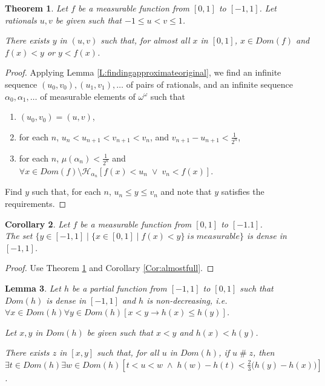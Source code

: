 \documentclass[a4paper]{amsart}
\theoremstyle{plain}
\newtheorem{theorem}{Theorem}
\newtheorem{corollary}[theorem]{Corollary}
\newtheorem{lemma}[theorem]{Lemma}
\begin{document}
 \begin{theorem}\label{T:findingoriginal} Let $f$ be a measurable function from $[0,1]$ to $[-1,1]$. Let rationals $u,v$ be given such that $-1\le u<v\le 1$.
 
 There exists $y$ in $(u,v)$ such that, for almost all $x$ in $[0,1]$, $x\in Dom(f)$ and $f(x) <y$ or $y<f(x)$. 
 \end{theorem} 
 
 \begin{proof} Applying Lemma \ref{L:findingapproximateoriginal}, we find an infinite sequence $(u_0, v_0), (u_1, v_1), \ldots$ of pairs of rationals, and an infinite sequence $\alpha_0, \alpha_1, \ldots$ of measurable elements of $\omega^\omega$ such that \begin{enumerate} \item $(u_0, v_0)= (u, v)$, \item for each $n$, $u_n < u_{n+1} < v_{n+1} < v_n$,  and $v_{n+1} - u_{n+1}<\frac{1}{2^n}$, \item for each $n$, $\mu(\alpha_n) < \frac{1}{2^n}$ and $\forall x \in Dom(f)\setminus \mathcal{H}_{\alpha_n}[f(x) < u_n \;\vee \;v_n < f(x)]$. \end{enumerate}
 
 Find $y$ such that, for each $n$, $u_n \le y \le v_n$ and note that $y$ satisfies the requirements. 
 \end{proof}
 \begin{corollary}\label{Cor:denseoriginal} Let $f$ be a measurable function from $[0,1]$ to $[-1.1]$.\\ The set $\{y\in [-1,1]\mid \{x\in [0,1]\mid f(x) <y\}\;is\;measurable\}$ is dense in $[-1,1]$. \end{corollary} \begin{proof} Use Theorem \ref{T:findingoriginal}  and Corollary \ref{Cor:almostfull}. \end{proof}
 \begin{lemma}\label{L:monotonecontinuouspreparation} Let $h$ be a partial function from $[-1,1]$ to $[0, 1]$ such that $ Dom(h)$ is dense in $[-1,1]$ and $h$ is non-decreasing, i.e. \\$\forall x \in Dom(h)\forall y \in Dom(h)[x<y\rightarrow h(x) \le h(y)]$. 
 
 Let $x,y$ in $Dom(h)$ be given such that $x<y$ and $h(x) < h(y)$. 
 
 There exists $z$ in $[x, y]$ such that, for all $u$ in $Dom(h)$, if $u\;\#\; z$, then  \\$\exists t\in Dom(h)\exists w\in Dom(h)[t<u<w \;\wedge\; h(w)-h(t) < \frac{2}{3}\bigl(h(y)-h(x)\bigr)]$. \end{lemma}
 
\end{document}
